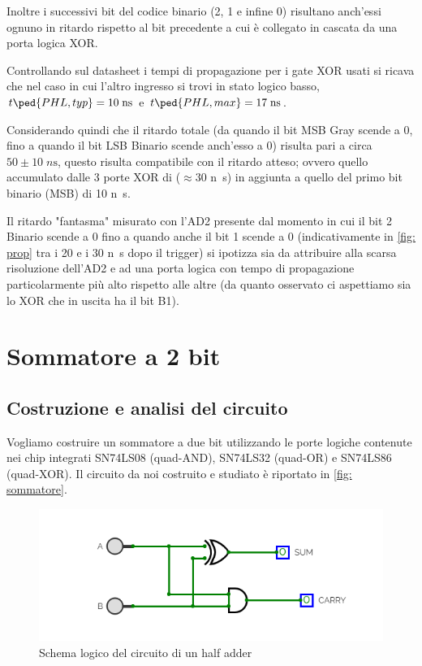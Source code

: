 \documentclass[10pt, a4paper, italian]{article}
\begin{document}
Inoltre i successivi bit del codice binario (2, 1 e infine 0) risultano
anch'essi ognuno in ritardo rispetto al bit precedente a cui è collegato in
cascata da una porta logica XOR.

Controllando sul datasheet i tempi di propagazione per i gate XOR usati si
ricava che nel caso in cui l'altro ingresso si trovi in stato logico basso,
$t\ped{PHL, typ} = 10 \; \si{n\s}$ e $t\ped{PHL, max} = 17 \; \si{n\s}$.

Considerando quindi che il ritardo totale (da quando il bit MSB Gray scende a
0, fino a quando il bit LSB Binario scende anch'esso a 0) risulta pari a circa
$50 \pm 10 \; \si{n\s}$, questo risulta compatibile con il ritardo atteso;
ovvero quello accumulato dalle 3 porte XOR di ($\approx 30$ \si{n\s}) in
aggiunta a quello del primo bit binario (MSB) di 10 \si{n\s}.

Il ritardo "fantasma" misurato con l'AD2 presente dal momento in cui il bit
2 Binario scende a 0 fino a quando anche il bit 1 scende a 0 (indicativamente
in \cref{fig: prop} tra i 20 e i 30 \si{n\s} dopo il trigger) si ipotizza sia
da attribuire alla scarsa risoluzione dell'AD2 e ad una porta logica con tempo
di propagazione particolarmente più alto rispetto alle altre (da quanto
osservato ci aspettiamo sia lo XOR che in uscita ha il bit B1).

\section{Sommatore a 2 bit}
\subsection{Costruzione e analisi del circuito}
Vogliamo costruire un sommatore a due bit utilizzando le porte logiche
contenute nei chip integrati SN74LS08 (quad-AND), SN74LS32 (quad-OR) e
SN74LS86 (quad-XOR). Il circuito da noi costruito e studiato è riportato in
\cref{fig: sommatore}.
\begin{figure}[htbp]
    \centering
    \includegraphics[width=0.6\linewidth]{half}
    \caption{Schema logico del circuito di un half adder
    \label{fig: halfadder}}
\end{figure}
\end{document}
